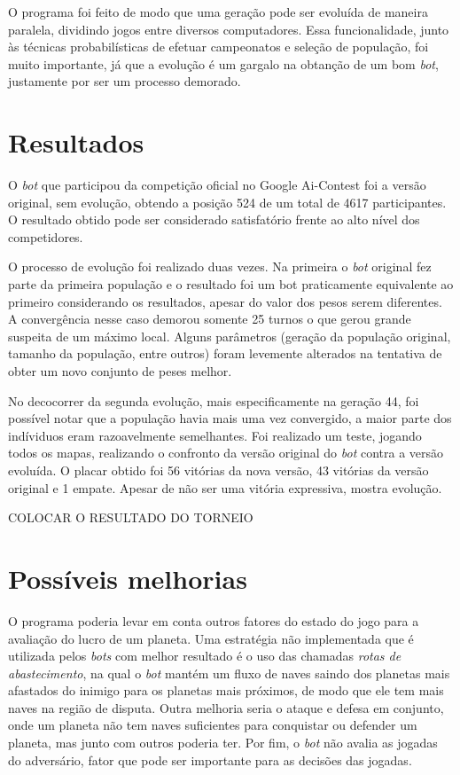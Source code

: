 \documentclass[a4paper,titlepage,11pt]{article}
\begin{document}
O programa foi feito de modo que uma geração pode ser evoluída de maneira paralela, dividindo jogos entre diversos computadores. Essa funcionalidade, junto às técnicas probabilísticas de efetuar campeonatos e seleção de população, foi muito importante, já que a evolução é um gargalo na obtanção de um bom {\em bot}, justamente por ser um processo demorado.

\section{Resultados}
O {\em bot} que participou da competição oficial no Google Ai-Contest foi a versão original, sem evolução, obtendo a posição 524 de um total de 4617 participantes. O resultado obtido pode ser considerado satisfatório frente ao alto nível dos competidores.

O processo de evolução foi realizado duas vezes. Na primeira o {\em bot} original fez parte da primeira população e o resultado foi um bot praticamente equivalente ao primeiro considerando os resultados, apesar do valor dos pesos serem diferentes. A convergência nesse caso demorou somente 25 turnos o que gerou grande suspeita de um máximo local. Alguns parâmetros (geração da população original, tamanho da população, entre outros) foram levemente alterados na tentativa de obter um novo conjunto de peses melhor.

No decocorrer da segunda evolução, mais especificamente na geração 44, foi possível notar que a população havia mais uma vez convergido, a maior parte dos indíviduos eram razoavelmente semelhantes. Foi realizado um teste, jogando todos os mapas, realizando o confronto da versão original do {\em bot} contra a versão evoluída. O placar obtido foi 56 vitórias da nova versão, 43 vitórias da versão original e 1 empate. Apesar de não ser uma vitória expressiva, mostra evolução.

COLOCAR O RESULTADO DO TORNEIO

\section{Possíveis melhorias}
O programa poderia levar em conta outros fatores do estado do jogo para a avaliação do lucro de um planeta. Uma estratégia não implementada que é utilizada pelos {\em bots} com melhor resultado é o uso das chamadas {\em rotas de abastecimento}, na qual o {\em bot} mantém um fluxo de naves saindo dos planetas mais afastados do inimigo para os planetas mais próximos, de modo que ele tem mais naves na região de disputa. Outra melhoria seria o ataque e defesa em conjunto, onde um planeta não tem naves suficientes para conquistar ou defender um planeta, mas junto com outros poderia ter. Por fim, o {\em bot} não avalia as jogadas do adversário, fator que pode ser importante para as decisões das jogadas.
\end{document}

